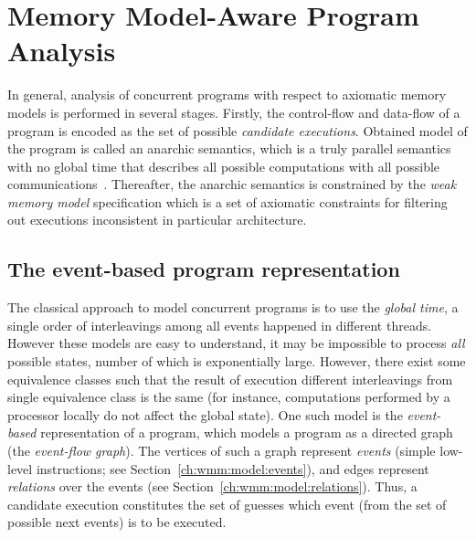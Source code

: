 \chapter{Memory Model-Aware Program Analysis}
\label{ch:wmm}

In general, analysis of concurrent programs with respect to axiomatic memory models is performed in several stages. Firstly, the control-flow and data-flow of a program is encoded as the set of possible \textit{candidate executions}. %
Obtained model of the program is called an anarchic semantics, which is a truly parallel semantics with no global time that describes all possible computations with all possible communications~\cite{alglave2016syntax}. Thereafter, the anarchic semantics is constrained by the \textit{weak memory model} specification which is a set of axiomatic constraints for filtering out executions inconsistent in particular architecture.


\section{The event-based program representation}
\label{ch:wmm:event}


The classical approach to model concurrent programs is to use the \textit{global time}, a single order of interleavings among all events happened in different threads. However these models are easy to understand, it may be impossible to process \textit{all} possible states, number of which is exponentially large. However, there exist some equivalence classes such that the result of execution different interleavings from single equivalence class is the same (for instance, computations performed by a processor locally do not affect the global state).
One such model is the \textit{event-based} representation of a program, which models a program as a directed graph (the \textit{event-flow graph}). The vertices of such a graph represent \textit{events} (simple low-level instructions; see Section~\ref{ch:wmm:model:events}), and edges represent \textit{relations} over the events (see Section~\ref{ch:wmm:model:relations}). Thus, a candidate execution constitutes the set of guesses which event (from the set of possible next events) is to be executed. 


